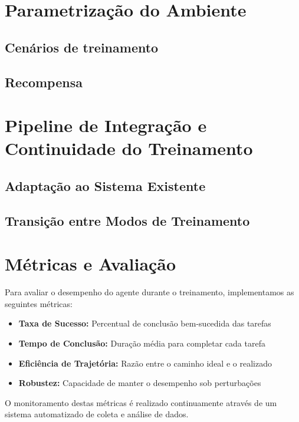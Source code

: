 \section{Parametrização do Ambiente}

\subsection{Cenários de treinamento}

\subsection{Recompensa}



\section{Pipeline de Integração e Continuidade do Treinamento}

\subsection{Adaptação ao Sistema Existente}

\subsection{Transição entre Modos de Treinamento}



\section{Métricas e Avaliação}

Para avaliar o desempenho do agente durante o treinamento, implementamos as seguintes métricas:

\begin{itemize}
    \item \textbf{Taxa de Sucesso:} Percentual de conclusão bem-sucedida das tarefas
    \item \textbf{Tempo de Conclusão:} Duração média para completar cada tarefa
    \item \textbf{Eficiência de Trajetória:} Razão entre o caminho ideal e o realizado
    \item \textbf{Robustez:} Capacidade de manter o desempenho sob perturbações
\end{itemize}

O monitoramento destas métricas é realizado continuamente através de um sistema automatizado de coleta e análise de dados.